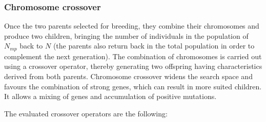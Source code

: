 \documentclass{ametsoc}
\begin{document}
\subsubsection{Chromosome crossover}
			
Once the two parents selected for breeding, they combine their chromosomes and produce two children, bringing the number of individuals in the population of $N_{mp}$ back to $N$ (the parents also return back in the total population in order to complement the next generation). The combination of chromosomes is carried out using a crossover operator, thereby generating two offspring having characteristics derived from both parents. Chromosome crossover widens the search space and favours the combination of strong genes, which can result in more suited children. It allows a mixing of genes and accumulation of positive mutations.

The evaluated crossover operators are the following:
\end{document}
